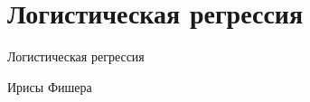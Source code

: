 \documentclass[10pt]{beamer}
\begin{document}

\section{Логистическая регрессия}


\begin{frame}{}

\begin{center}
\Large Логистическая регрессия
\end{center}

\end{frame}

\begin{frame}{Ирисы Фишера}


\end{frame}
\end{document}
